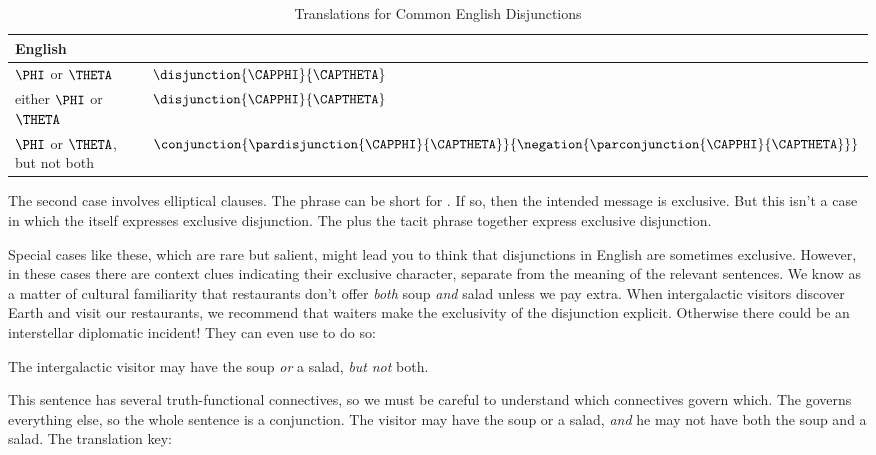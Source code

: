 \begin{table}
	\renewcommand{\arraystretch}{1.5}%
	\begin{center}
		\begin{tabular}{ l l } %
			\toprule
			\textbf{English} & \textbf{\GSL{}} \\ 
			\midrule
			$\PHI$ or $\THETA$ & $\disjunction{\CAPPHI}{\CAPTHETA}$ \\
			either $\PHI$ or $\THETA$ & $\disjunction{\CAPPHI}{\CAPTHETA}$ \\
			$\PHI$ or $\THETA$, but not both & $\conjunction{\pardisjunction{\CAPPHI}{\CAPTHETA}}{\negation{\parconjunction{\CAPPHI}{\CAPTHETA}}}$ \\
			\bottomrule
		\end{tabular} 
		\caption{Translations for Common English Disjunctions}
		\label{TransTableC} 
	\end{center}
\end{table}

The second case involves elliptical clauses. 
The phrase  can be short for . 
If so, then the intended message is exclusive. 
But this isn't a case in which the  itself expresses exclusive disjunction. 
The  plus the tacit phrase  together express exclusive disjunction.

Special cases like these, which are rare but salient, might lead you to think that disjunctions in English are sometimes exclusive.
However, in these cases there are context clues indicating their exclusive character, separate from the meaning of the relevant sentences.
We know as a matter of cultural familiarity that restaurants don't offer \emph{both} soup \emph{and} salad unless we pay extra.  
When intergalactic visitors discover Earth and visit our restaurants, we recommend that waiters make the exclusivity of the disjunction explicit.
Otherwise there could be an interstellar diplomatic incident!
They can even use \GSL{} to do so:
 	
 \begin{menumerate}
 	\item The intergalactic visitor may have the soup \emph{or} a salad, \emph{but} \emph{not} both.
 \end{menumerate}
 	
\noindent{}This sentence has several truth-functional connectives, so we must be careful to understand which connectives govern which.
The  governs everything else, so the whole sentence is a conjunction.
The visitor may have the soup or a salad, \emph{and} he may not have both the soup and a salad.
The translation key:

